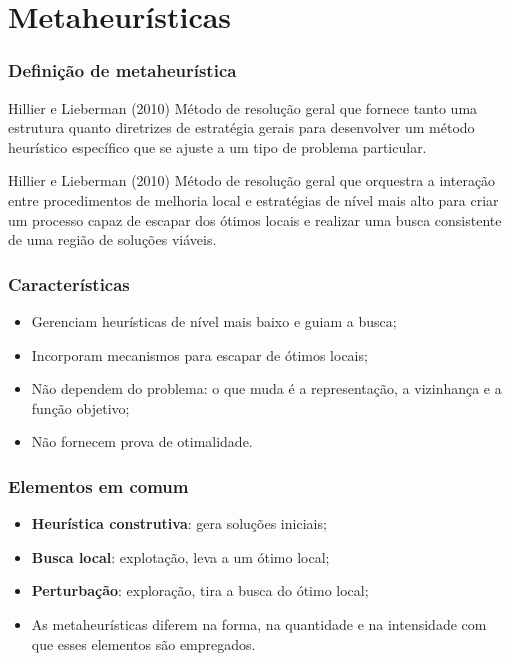 \documentclass[fleqn]{beamer}
\begin{document}
\section{Metaheurísticas}

\begin{frame}
	\frametitle{Definição de metaheurística}
	\begin{block}{Hillier e Lieberman (2010)}
		Método de resolução geral que fornece tanto uma estrutura quanto
		diretrizes de estratégia gerais para desenvolver um método
		heurístico específico que se ajuste a um tipo de problema
		particular.
	\end{block}
	\begin{block}{Hillier e Lieberman (2010)}
		Método de resolução geral que orquestra a interação entre
		procedimentos de melhoria local e estratégias de nível mais alto
		para criar um processo capaz de escapar dos ótimos locais e
		realizar uma busca consistente de uma região de soluções viáveis.
	\end{block}
\end{frame}

\begin{frame}
	\frametitle{Características}
	\begin{itemize}
		\item Gerenciam heurísticas de nível mais baixo e guiam a busca;
		\item Incorporam mecanismos para escapar de ótimos locais;
		\item Não dependem do problema: o que muda é a representação, a
			vizinhança e a função objetivo;
		\item Não fornecem prova de otimalidade.
	\end{itemize}
\end{frame}

\begin{frame}
	\frametitle{Elementos em comum}
	\begin{itemize}
		\item \textbf{Heurística construtiva}: gera soluções iniciais;
		\item \textbf{Busca local}: explotação, leva a um ótimo local;
		\item \textbf{Perturbação}: exploração, tira a busca do ótimo local;
		\item As metaheurísticas diferem na forma, na quantidade e na
			intensidade com que esses elementos são empregados.
	\end{itemize}
\end{frame}
\end{document}
